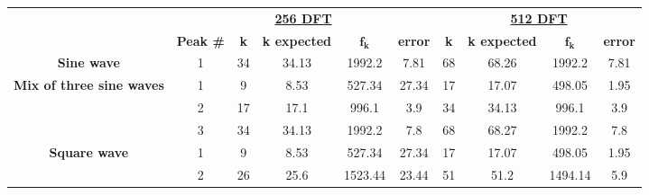 \begin{table}[h]
\centering\scriptsize
\begin{tabular}{c|c|c|c|c|c|c|c|c|c|}
\cline{2-10}
                                                                        & \multicolumn{5}{c|}{{\underline{\textbf{256 DFT}}}}                                           & \multicolumn{4}{c|}{{\underline{\textbf{512 DFT}}}}                       \\ \cline{2-10} 
                                                                        & \textbf{Peak \#} & \textbf{k} & \textbf{k expected} & $\mathbf{f_k}$ & \textbf{error} & \textbf{k} & \textbf{k expected} & $\mathbf{f_k}$ & \textbf{error} \\ \hline
\multicolumn{1}{|c|}{\textbf{Sine wave}}                                & 1                & 34         & 34.13               & 1992.2         & \color[HTML]{FE0000}7.81            & 68         & 68.26               & 1992.2       & \color[HTML]{FE0000}7.81          \\ \hline
\multicolumn{1}{|c|}{\multirow{3}{*}{\textbf{Mix of three sine waves}}} & 1                & 9          & 8.53                & 527.34         & \color[HTML]{FE0000}27.34          & 17         & 17.07               & 498.05           & \color[HTML]{32CB00}1.95              \\ \cline{2-10} 
\multicolumn{1}{|c|}{}                                                  & 2                & 17         & 17.1                & 996.1          & \color[HTML]{FE0000}3.9            & 34         & 34.13               & 996.1         & \color[HTML]{FE0000}3.9            \\ \cline{2-10} 
\multicolumn{1}{|c|}{}                                                  & 3                & 34         & 34.13               & 1992.2         & \color[HTML]{FE0000}7.8            & 68         & 68.27               & 1992.2        & \color[HTML]{FE0000}7.8            \\ \hline
\multicolumn{1}{|c|}{\multirow{7}{*}{\textbf{Square wave}}}             & 1                & 9          & 8.53                & 527.34         & \color[HTML]{FE0000}27.34          & 17         & 17.07               & 498.05           & \color[HTML]{32CB00}1.95              \\ \cline{2-10} 
\multicolumn{1}{|c|}{}                                                  & 2                & 26         & 25.6                & 1523.44        & \color[HTML]{FE0000}23.44          & 51         & 51.2                & 1494.14       & \color[HTML]{32CB00}5.9            \\ \cline{2-10} 

\end{tabular}
\end{table}
